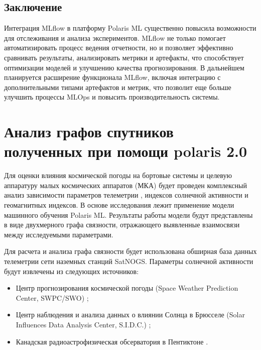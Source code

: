 \documentclass[14pt, a4paper]{bsu}
\begin{document}
\section{Заключение}

Интеграция MLflow в платформу Polaris ML существенно повысила
возможности для отслеживания и анализа экспериментов. MLflow не
только помогает автоматизировать процесс ведения отчетности, но и
позволяет эффективно сравнивать результаты, анализировать метрики и
артефакты, что способствует оптимизации моделей и улучшению
качества прогнозирования. В дальнейшем планируется расширение
функционала MLflow, включая интеграцию с дополнительными типами
артефактов и метрик, что позволит еще больше улучшить процессы
MLOps и повысить производительность системы.

\newpage

\chapter{Анализ графов спутников полученных при помощи polaris 2.0}

Для оценки влияния космической погоды на бортовые системы и целевую
аппаратуру малых космических аппаратов (МКА) будет проведен
комплексный анализ зависимости параметров телеметрии
\cite{green_2017_impact} \cite{schlag_2018_numerical}
\cite{boumghar_2018_enhanced}, индексов солнечной активности и
геомагнитных индексов. В основе исследования лежит применение
модели машинного обучения Polaris ML. Результаты работы модели
будут представлены в виде двухмерного графа связности, отражающего
выявленные взаимосвязи между исследуемыми параметрами.

Для расчета и анализа графа связности будет использована обширная
база данных телеметрии сети наземных станций SatNOGS. Параметры
солнечной активности будут извлечены из следующих источников:

\begin{itemize} \item Центр прогнозирования космической погоды (Space
	      Weather Prediction Center, SWPC/SWO) \cite{swpc_noaa_data_souce};
	\item Центр наблюдения и анализа данных о влиянии Солнца в Брюсселе
	      (Solar Influences Data Analysis Center, S.I.D.C.)
	      \cite{silso_snd_data_source}; \item Канадская
	      радиоастрофизическая обсерватория в Пентиктоне
	      \cite{swgc_flux_data_source}. \end{itemize}
\end{document}
